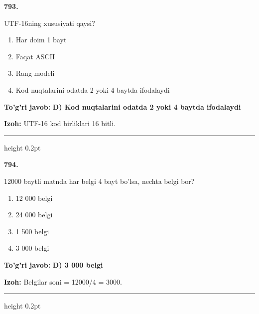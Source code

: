 \documentclass[10pt,a4paper,oneside]{article}
\begin{document}
\noindent\textbf{\color{ink}793.}
\par
UTF-16ning xususiyati qaysi?
\begin{enumerate}[label=\Alph*),leftmargin=9mm]
\item Har doim 1 bayt
\item Faqat ASCII
\item Rang modeli
\item Kod nuqtalarini odatda 2 yoki 4 baytda ifodalaydi
\end{enumerate}
\begin{tcolorbox}[enhanced,breakable,colback=teal!4,colframe=teal!50!black,boxrule=0.5pt,arc=1.1mm,left=3mm,right=3mm,top=1.7mm,bottom=1.7mm,before skip=2mm,after skip=2mm]
\textbf{\color{teal}To'g'ri javob:} \textbf{D) Kod nuqtalarini odatda 2 yoki 4 baytda ifodalaydi}
\par\smallskip
\textbf{Izoh:} UTF-16 kod birliklari 16 bitli.
\end{tcolorbox}
\vspace{2mm}\hrule height 0.2pt \vspace{3mm}

\noindent\textbf{\color{ink}794.}
\par
12000 baytli matnda har belgi 4 bayt bo'lsa, nechta belgi bor?
\begin{enumerate}[label=\Alph*),leftmargin=9mm]
\item 12 000 belgi
\item 24 000 belgi
\item 1 500 belgi
\item 3 000 belgi
\end{enumerate}
\begin{tcolorbox}[enhanced,breakable,colback=teal!4,colframe=teal!50!black,boxrule=0.5pt,arc=1.1mm,left=3mm,right=3mm,top=1.7mm,bottom=1.7mm,before skip=2mm,after skip=2mm]
\textbf{\color{teal}To'g'ri javob:} \textbf{D) 3 000 belgi}
\par\smallskip
\textbf{Izoh:} Belgilar soni = 12000/4 = 3000.
\end{tcolorbox}
\vspace{2mm}\hrule height 0.2pt \vspace{3mm}
\end{document}
